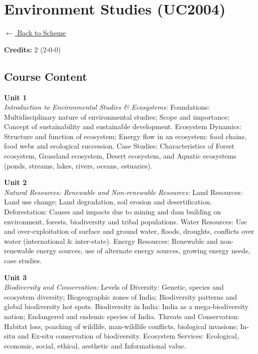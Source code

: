 \section*{Environment Studies (UC2004)}
\label{course:UC2004}

\noindent \small{\hyperref[main:scheme]{$\leftarrow$ Back to Scheme}} \vspace{0.5cm}

\noindent \textbf{Credits:} 2 (2-0-0)

\subsection*{Course Content}
\noindent\textbf{Unit 1} \\
\textit{Introduction to Environmental Studies \& Ecosystems:} Foundations: Multidisciplinary nature of environmental studies; Scope and importance; Concept of sustainability and sustainable development. Ecosystem Dynamics: Structure and function of ecosystem; Energy flow in an ecosystem: food chains, food webs and ecological succession. Case Studies: Characteristics of Forest ecosystem, Grassland ecosystem, Desert ecosystem, and Aquatic ecosystems (ponds, streams, lakes, rivers, oceans, estuaries).

\vspace{0.3cm}

\noindent\textbf{Unit 2} \\
\textit{Natural Resources: Renewable and Non-renewable Resources:} Land Resources: Land use change; Land degradation, soil erosion and desertification. Deforestation: Causes and impacts due to mining and dam building on environment, forests, biodiversity and tribal populations. Water Resources: Use and over-exploitation of surface and ground water, floods, droughts, conflicts over water (international \& inter-state). Energy Resources: Renewable and non-renewable energy sources, use of alternate energy sources, growing energy needs, case studies.

\vspace{0.3cm}

\noindent\textbf{Unit 3} \\
\textit{Biodiversity and Conservation:} Levels of Diversity: Genetic, species and ecosystem diversity; Biogeographic zones of India; Biodiversity patterns and global biodiversity hot spots. Biodiversity in India: India as a mega-biodiversity nation; Endangered and endemic species of India. Threats and Conservation: Habitat loss, poaching of wildlife, man-wildlife conflicts, biological invasions; In-situ and Ex-situ conservation of biodiversity. Ecosystem Services: Ecological, economic, social, ethical, aesthetic and Informational value.

